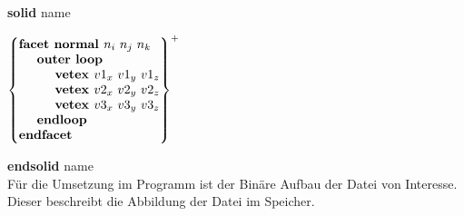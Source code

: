 \noindent\hspace{3cm} \textbf{solid }name
\begin{center}
$\begin{Bmatrix*}[l]
	\text{\textbf{facet normal }} n_{i} \text{ } n_{j} \text{ } n_{k} \\ 
	\text{\hspace{0.5cm}\textbf{outer loop }} \\
	\text{\hspace{1cm}\textbf{vetex }} v1_{x} \text{ } v1_{y} \text{ } v1_{z} \\
	\text{\hspace{1cm}\textbf{vetex }} v2_{x} \text{ } v2_{y} \text{ } v2_{z} \\
	\text{\hspace{1cm}\textbf{vetex }} v3_{x} \text{ } v3_{y} \text{ } v3_{z} \\ 
	\text{\hspace{0.5cm}\textbf{endloop}}\\ 
	\text{\textbf{endfacet}}
\end{Bmatrix*}^{+}$
\end{center}
\hspace{3cm} \textbf{endsolid }name\\

\noindent Für die Umsetzung im Programm ist der Binäre Aufbau der Datei von Interesse. Dieser beschreibt die Abbildung der Datei im Speicher\citep{STLFormat}.\\

